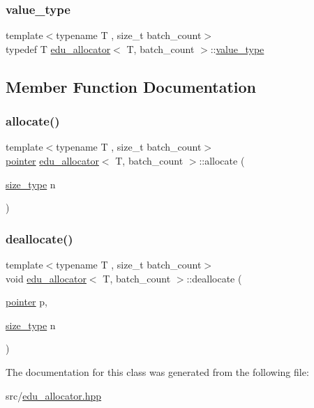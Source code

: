 \subsubsection{\texorpdfstring{value\+\_\+type}{value\_type}}
{\footnotesize\ttfamily template$<$typename T , size\+\_\+t batch\+\_\+count$>$ \\
typedef T \hyperlink{classedu__allocator}{edu\+\_\+allocator}$<$ T, batch\+\_\+count $>$\+::\hyperlink{classedu__allocator_aa6e217af32ed52f939e61187da75f6f4}{value\+\_\+type}}



\subsection{Member Function Documentation}
\mbox{\label{classedu__allocator_ab9fef5bee217179075d0e61f4d55ad29}} 
\subsubsection{\texorpdfstring{allocate()}{allocate()}}
{\footnotesize\ttfamily template$<$typename T , size\+\_\+t batch\+\_\+count$>$ \\
\hyperlink{classedu__allocator_a9dc4e322674eb71d33056e8ab3c69e8f}{pointer} \hyperlink{classedu__allocator}{edu\+\_\+allocator}$<$ T, batch\+\_\+count $>$\+::allocate (\begin{DoxyParamCaption}\item[{\hyperlink{classedu__allocator_a0f1fd4593fe3a8dcaf9381821f88a8e4}{size\+\_\+type}}]{n }\end{DoxyParamCaption})\hspace{0.3cm}{\ttfamily [inline]}}

\mbox{\label{classedu__allocator_a0b5450f0bd0a44f1a195e25e45352778}} 
\subsubsection{\texorpdfstring{deallocate()}{deallocate()}}
{\footnotesize\ttfamily template$<$typename T , size\+\_\+t batch\+\_\+count$>$ \\
void \hyperlink{classedu__allocator}{edu\+\_\+allocator}$<$ T, batch\+\_\+count $>$\+::deallocate (\begin{DoxyParamCaption}\item[{\hyperlink{classedu__allocator_a9dc4e322674eb71d33056e8ab3c69e8f}{pointer}}]{p,  }\item[{\hyperlink{classedu__allocator_a0f1fd4593fe3a8dcaf9381821f88a8e4}{size\+\_\+type}}]{n }\end{DoxyParamCaption})\hspace{0.3cm}{\ttfamily [inline]}}



The documentation for this class was generated from the following file\+:\begin{DoxyCompactItemize}
\item 
src/\hyperlink{edu__allocator_8hpp}{edu\+\_\+allocator.\+hpp}\end{DoxyCompactItemize}
